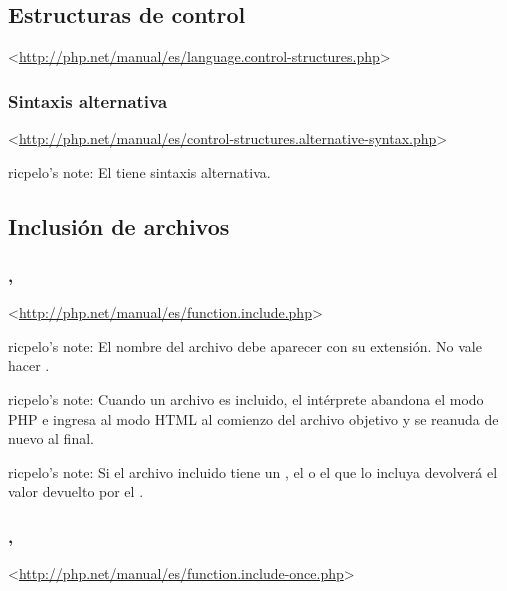 \documentclass[a4paper,11pt,spanish]{sphinxmanual}
\begin{document}
\subsection{Estructuras de control}
\label{\detokenize{php:estructuras-de-control}}
\textless{}\url{http://php.net/manual/es/language.control-structures.php}\textgreater{}


\subsubsection{Sintaxis alternativa}
\label{\detokenize{php:sintaxis-alternativa}}
\textless{}\url{http://php.net/manual/es/control-structures.alternative-syntax.php}\textgreater{}

ricpelo's note: El   tiene sintaxis
alternativa.


\subsection{Inclusión de archivos}
\label{\detokenize{php:inclusion-de-archivos}}

\subsubsection{, }
\label{\detokenize{php:include-require}}
\textless{}\url{http://php.net/manual/es/function.include.php}\textgreater{}

\begin{DUlineblock}{0em}
\item[] ricpelo's note: El nombre del archivo debe aparecer con su extensión.
No vale hacer .
\item[] ricpelo's note: Cuando un archivo es incluido, el intérprete abandona
el modo PHP e ingresa al modo HTML al comienzo del archivo objetivo y
se reanuda de nuevo al final.
\item[] ricpelo's note: Si el archivo incluido tiene un , el
 o el  que lo incluya devolverá el valor
devuelto por el .
\end{DUlineblock}


\subsubsection{, }
\label{\detokenize{php:include-once-require-once}}
\textless{}\url{http://php.net/manual/es/function.include-once.php}\textgreater{}
\end{document}
